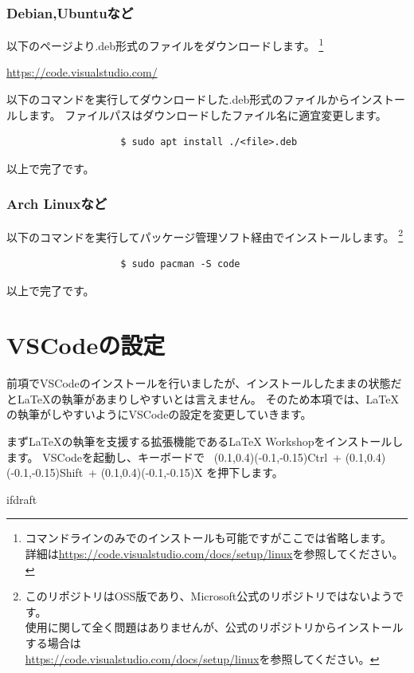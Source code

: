 			\subsubsection{Debian,Ubuntuなど}
				以下のページより.deb形式のファイルをダウンロードします。
				\footnote{コマンドラインのみでのインストールも可能ですがここでは省略します。
						\\詳細は\url{https://code.visualstudio.com/docs/setup/linux}を参照してください。}
				\begin{mdframed}[style=shadow]
					\url{https://code.visualstudio.com/}
				\end{mdframed}
				以下のコマンドを実行してダウンロードした.deb形式のファイルからインストールします。
				ファイルパスはダウンロードしたファイル名に適宜変更します。
				\begin{mdframed}[style=bash]
					\begin{verbatim}
					$ sudo apt install ./<file>.deb
					\end{verbatim}
				\end{mdframed}
				以上で完了です。

			\subsubsection{Arch Linuxなど}
				以下のコマンドを実行してパッケージ管理ソフト経由でインストールします。
				\footnote{このリポジトリはOSS版であり、Microsoft公式のリポジトリではないようです。
						\\使用に関して全く問題はありませんが、公式のリポジトリからインストールする場合は
						\\\url{https://code.visualstudio.com/docs/setup/linux}を参照してください。}
				\begin{mdframed}[style=bash]
					\begin{verbatim}
					$ sudo pacman -S code
					\end{verbatim}
				\end{mdframed}
				以上で完了です。

	\section{VSCodeの設定}
		前項でVSCodeのインストールを行いましたが、インストールしたままの状態だと\LaTeX の執筆があまりしやすいとは言えません。
		そのため本項では、\LaTeX の執筆がしやすいようにVSCodeの設定を変更していきます。

		まず\LaTeX の執筆を支援する拡張機能であるLaTeX Workshopをインストールします。
		VSCodeを起動し、キーボードで~
		(0.1,0.4)(-0.1,-0.15)Ctrl~+
		(0.1,0.4)(-0.1,-0.15)Shift~+
		(0.1,0.4)(-0.1,-0.15)X
		を押下します。

\expandafter\ifx\csname ifdraft\endcsname\relax

\fi